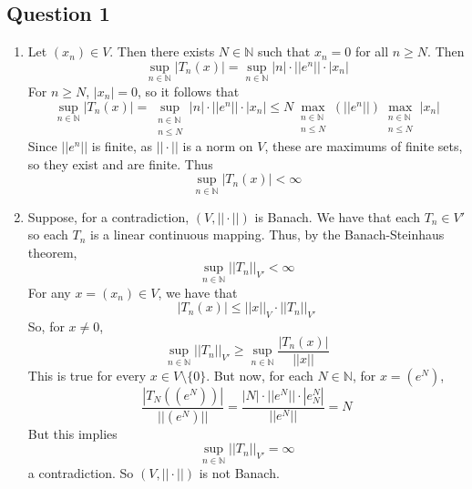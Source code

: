 \documentclass[letterpaper, 11pt]{article}
\newcommand{\1}{\mathds{1}}	%
\theoremstyle{definition}
\begin{document}
\subsection*{Question 1}
\begin{enumerate}
	\item[(a)] Let $(x_n) \in V$. Then there exists $N \in \mathbb{N}$ such that $x_n = 0$ for all $n \ge N$. Then \[
	\sup \limits _{n \in \mathbb{N}}|T_n(x)| = \sup \limits _{n \in \mathbb{N}} |n| \cdot || e^n ||\cdot  |x_n|
	\]
	For $n \ge N$, $|x_n| = 0$, so it follows that \[
	\sup \limits _{n \in \mathbb{N}}|T_n(x)| = \sup \limits _{\substack{n \in \mathbb{N} \\ n \le N}} |n| \cdot ||e^n || \cdot |x_n| \le N \max \limits _{\substack{n \in \mathbb{N} \\ n \le N}} (||e^n||) \max \limits _{\substack{n \in \mathbb{N} \\ n \le N}} |x_n|
	\]
	Since $||e^n||$ is finite, as $||\cdot ||$ is a norm on $V$, these are maximums of finite sets, so they exist and are finite. Thus \[
	\sup \limits _{n\in \mathbb{N}} |T_n (x)| < \infty
	\]
	\item[(b)] Suppose, for a contradiction, $(V, ||\cdot ||)$ is Banach. We have that each $T_n \in V'$ so each $T_n$ is a linear continuous mapping. Thus, by the Banach-Steinhaus theorem, \[
	\sup \limits _{n \in \mathbb{N}} ||T_n||_{V'} < \infty
	\]
  For any $x = (x_n) \in V$, we have that \[
  |T_n(x)| \le ||x||_V \cdot ||T_n ||_{V'}
  \]
So, for $x \ne 0$,
  \[
  \sup \limits _{n \in \mathbb{N}} ||T_n||_{V'}
 \ge \sup \limits _{n \in \mathbb{N}} \frac{|T_n(x)|}{||x||} 
 \]
 This is true for every $x \in V \setminus \{0\}$. But now, for each $N \in \mathbb{N}$, for $x = (e^N)$, \[
\frac{|T_N((e^N))|}{||(e^N)||} = \frac{|N| \cdot ||e^N|| \cdot |e_N^N|}{||e^N||} = N
\]
But this implies \[
\sup \limits _{n \in \mathbb{N}} ||T_n||_{V'} = \infty
\]
a contradiction. So $(V, ||\cdot ||)$ is not Banach.
\end{enumerate}
\end{document}
